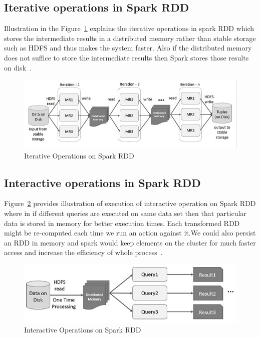 \subsection{Iterative operations in Spark RDD}

Illustration in the Figure~\ref{fig:iterative-spark} explains the iterative 
operations in spark RDD which stores the intermediate results in a distributed 
memory rather than stable storage such as HDFS and thus makes the system faster.
Also if the distributed memory does not suffice to store the intermediate 
results then Spark stores those results on disk~\cite{hid-sp18-410-spark-RDD}.

\begin{figure}[!ht]
  \centering\includegraphics[width=\columnwidth]{images/iterativeSpark.png}
   \caption{Iterative Operations on Spark RDD
   ~\cite{hid-sp18-410-spark-RDD}}\label{fig:iterative-spark}
\end{figure}

\subsection{Interactive operations in Spark RDD}

Figure~\ref{fig:interactive-spark} provides illustration of execution of 
interactive operation on Spark RDD where in if different queries are executed on
 same data set then that particular data is stored in memory for better 
 execution times. Each transformed RDD might be re-computed each time we run an 
 action against it.We could also persist an RDD in memory and spark would keep 
 elements on the cluster for much faster access and increase the efficiency of 
 whole process~\cite{hid-sp18-410-spark-RDD}.


\begin{figure}[!ht]
  \centering\includegraphics[width=\columnwidth]{images/interactiveSpark.png}
   \caption{Interactive Operations on Spark RDD
   ~\cite{hid-sp18-410-spark-RDD}}\label{fig:interactive-spark}
\end{figure}

